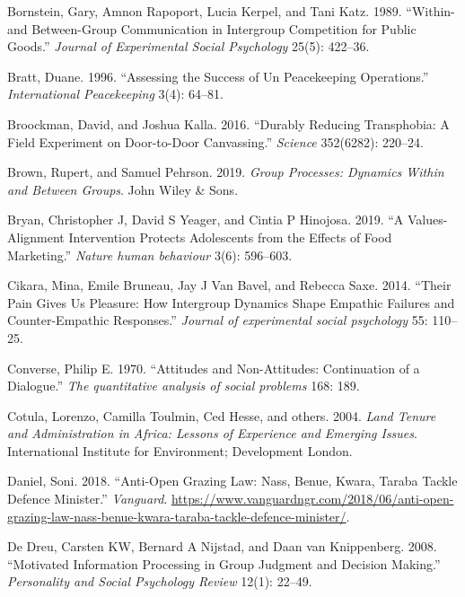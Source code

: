 \documentclass[11pt]{article}
\begin{document}
\leavevmode\hypertarget{ref-bornstein1989within}{}%
Bornstein, Gary, Amnon Rapoport, Lucia Kerpel, and Tani Katz. 1989.
``Within-and Between-Group Communication in Intergroup Competition for
Public Goods.'' \emph{Journal of Experimental Social Psychology} 25(5):
422--36.

\leavevmode\hypertarget{ref-bratt1996assessing}{}%
Bratt, Duane. 1996. ``Assessing the Success of Un Peacekeeping
Operations.'' \emph{International Peacekeeping} 3(4): 64--81.

\leavevmode\hypertarget{ref-broockman2016durably}{}%
Broockman, David, and Joshua Kalla. 2016. ``Durably Reducing
Transphobia: A Field Experiment on Door-to-Door Canvassing.''
\emph{Science} 352(6282): 220--24.

\leavevmode\hypertarget{ref-brown2019group}{}%
Brown, Rupert, and Samuel Pehrson. 2019. \emph{Group Processes: Dynamics
Within and Between Groups}. John Wiley \& Sons.

\leavevmode\hypertarget{ref-bryan2019values}{}%
Bryan, Christopher J, David S Yeager, and Cintia P Hinojosa. 2019. ``A
Values-Alignment Intervention Protects Adolescents from the Effects of
Food Marketing.'' \emph{Nature human behaviour} 3(6): 596--603.

\leavevmode\hypertarget{ref-cikara2014their}{}%
Cikara, Mina, Emile Bruneau, Jay J Van Bavel, and Rebecca Saxe. 2014.
``Their Pain Gives Us Pleasure: How Intergroup Dynamics Shape Empathic
Failures and Counter-Empathic Responses.'' \emph{Journal of experimental
social psychology} 55: 110--25.

\leavevmode\hypertarget{ref-converse1970attitudes}{}%
Converse, Philip E. 1970. ``Attitudes and Non-Attitudes: Continuation of
a Dialogue.'' \emph{The quantitative analysis of social problems} 168:
189.

\leavevmode\hypertarget{ref-cotula2004land}{}%
Cotula, Lorenzo, Camilla Toulmin, Ced Hesse, and others. 2004.
\emph{Land Tenure and Administration in Africa: Lessons of Experience
and Emerging Issues}. International Institute for Environment;
Development London.

\leavevmode\hypertarget{ref-daniel2018anti}{}%
Daniel, Soni. 2018. ``Anti-Open Grazing Law: Nass, Benue, Kwara, Taraba
Tackle Defence Minister.'' \emph{Vanguard}.
\url{https://www.vanguardngr.com/2018/06/anti-open-grazing-law-nass-benue-kwara-taraba-tackle-defence-minister/}.

\leavevmode\hypertarget{ref-de2008motivated}{}%
De Dreu, Carsten KW, Bernard A Nijstad, and Daan van Knippenberg. 2008.
``Motivated Information Processing in Group Judgment and Decision
Making.'' \emph{Personality and Social Psychology Review} 12(1): 22--49.
\end{document}
